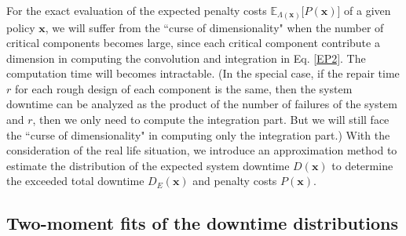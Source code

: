 \documentclass[preprint,12pt]{elsarticle}
\begin{document}
For the exact evaluation of the expected penalty costs $\mathbb{E}_{\Lambda(\boldsymbol{x})}\big[P(\boldsymbol{x})\big]$ of a given policy $\boldsymbol{x}$, we will suffer from the ``curse of dimensionality" when the number of critical components becomes large, since each critical component contribute a dimension in computing the convolution and integration in Eq. \eqref{EP2}. The computation time will becomes intractable. (In the special case, if the repair time $r$ for each rough design of each component is the same, then the system downtime can be analyzed as the product of the number of failures of the system and $r$, then we only need to compute the integration part. But we will still face the ``curse of dimensionality" in computing only the integration part.) With the consideration of the real life situation, we introduce an approximation method to estimate the distribution of the expected system downtime $D(\boldsymbol{x})$ to determine the exceeded total downtime $D_{E}(\boldsymbol{x})$ and penalty costs $P(\boldsymbol{x})$.
\subsection{Two-moment fits of the downtime distributions}
\end{document}
